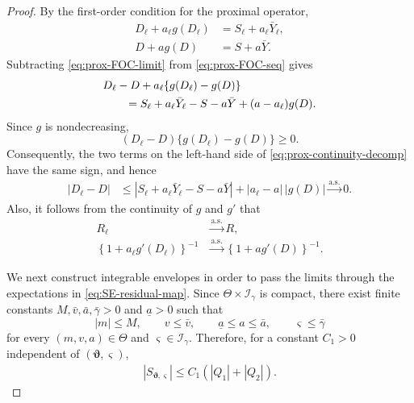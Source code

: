 \documentclass[10pt,a4paper]{amsart}
\newcommand{\as}{\overset{\mathrm{a.s.}}{\longrightarrow}}
\begin{document}
\begin{proof}
By the first-order condition for the proximal operator,
\begin{align}
D_\ell+a_\ell g(D_\ell)
&=
S_\ell+a_\ell\bar Y_\ell,
\label{eq:prox-FOC-seq}\\
D+a g(D)
&=
S+a\bar Y.
\label{eq:prox-FOC-limit}
\end{align}
Subtracting \eqref{eq:prox-FOC-limit} from
\eqref{eq:prox-FOC-seq} gives
\begin{align}
&D_\ell-D
+
a_\ell\{g(D_\ell)-g(D)\}
\notag\\
&\qquad=
S_\ell+a_\ell\bar Y_\ell
-
S-a\bar Y
+
(a-a_\ell)g(D).
\label{eq:prox-continuity-decomp}
\end{align}
Since $g$ is nondecreasing,
\[
(D_\ell-D)\{g(D_\ell)-g(D)\}\ge0.
\]
Consequently, the two terms on the left-hand side of
\eqref{eq:prox-continuity-decomp} have the same sign, and hence
\begin{align}
|D_\ell-D|
&\le
\left|
S_\ell+a_\ell\bar Y_\ell-S-a\bar Y\right|
+|a_\ell-a|\,|g(D)|
\as0.
\label{eq:prox-joint-continuity}
\end{align}
Also, it follows from the continuity of $g$ and $g'$ that
\begin{align}
R_\ell
&\as R,
\label{eq:residual-pointwise-conv}\\
\left\{
1+a_\ell g'(D_\ell)
\right\}^{-1}
&\as
\left\{
1+a g'(D)
\right\}^{-1}.
\label{eq:derivative-pointwise-conv}
\end{align}

We next construct integrable envelopes in order to pass the limits through
the expectations in \eqref{eq:SE-residual-map}. Since
$\Theta\times\mathcal I_\gamma$ is compact, there exist finite constants
$M,\bar v,\bar a,\bar\gamma>0$ and $\underline a>0$ such that
\[
|m|\le M,\qquad
v\le\bar v,\qquad
\underline a\le a\le\bar a,\qquad
\varsigma\le\bar\gamma
\]
for every
$(m,v,a)\in\Theta$ and
$\varsigma\in\mathcal I_\gamma$. Therefore, for a constant
$C_1>0$ independent of
$(\bm\vartheta,\varsigma)$,
\begin{align}
|S_{\bm\vartheta,\varsigma}|
\le
C_1(|Q_1|+|Q_2|).
\label{eq:linear-envelope}
\end{align}


\end{proof}
\end{document}
